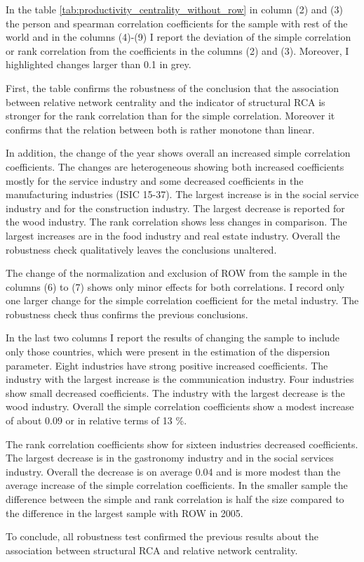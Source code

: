 In the table \cref{tab:productivity_centrality_without_row} in column (2) and (3) the person and spearman correlation coefficients for the sample with rest of the world and in the columns (4)-(9) I report the deviation of the simple correlation or rank correlation from the coefficients in the columns (2) and (3). Moreover, I highlighted changes larger than 0.1 in grey.  \par First, the table confirms the robustness of the conclusion that the association between relative network centrality and the indicator of structural RCA  is stronger for the rank correlation than for the simple correlation. Moreover it confirms   that the relation between both is rather monotone than linear.  \par In addition, the change of the year shows overall an increased  simple correlation coefficients. The changes are heterogeneous showing both increased coefficients mostly for the service industry and some decreased coefficients in the manufacturing industries (ISIC 15-37). The largest increase is in the social service industry and for the construction industry. The largest decrease is reported for the wood industry. The rank correlation shows less changes in comparison. The largest increases are in the food industry and real estate industry. Overall the robustness check qualitatively leaves the conclusions unaltered. \par The change of the normalization and exclusion of ROW from the sample in the columns (6) to (7) shows  only minor effects for both correlations.  I record only one larger change for the simple correlation coefficient for the metal industry. The robustness check thus confirms the previous conclusions. \par In the last two columns I report the results of changing the sample to include only those countries, which were present in the estimation of the dispersion parameter. Eight industries have strong positive increased coefficients.  The industry with the largest increase is the communication industry. Four industries show small decreased coefficients. The industry with the largest decrease is  the wood industry.  Overall the simple correlation coefficients show a modest increase of about 0.09 or in relative terms of 13 \%. \par The rank correlation coefficients show for sixteen industries decreased coefficients. The largest decrease is in the gastronomy industry and in the social services industry.  Overall the decrease is on average 0.04 and is more modest  than the average increase of the simple correlation coefficients.  In the smaller sample the difference between the simple and rank correlation is half the size compared to the difference in the largest sample with ROW in 2005.\par  To conclude, all robustness test confirmed the previous results about the association between structural RCA and relative network centrality.
